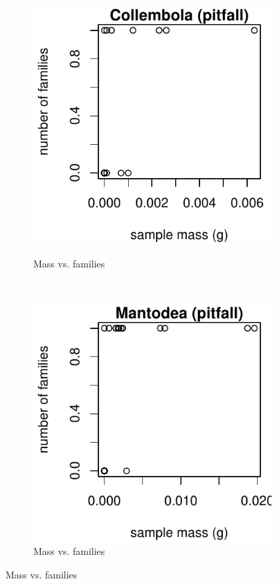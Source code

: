 \documentclass[10pt,letterpaper,twocolumn]{article}
\begin{document}
\begin{figure}[h]
	\centering
	\begin{subfigure}[b]{0.15\textwidth}
		\caption{Mass vs. families}
		\includegraphics[width=\textwidth]{plots/mass-vs-count/scatter/2015_pitfall_Collembola_mass-vs-count.pdf}
		\label{fig:pitfall_collembola_scatter}
	\end{subfigure}
	~
	\begin{subfigure}[b]{0.15\textwidth}
		\caption{Mass vs. families}
		\includegraphics[width=\textwidth]{plots/mass-vs-count/scatter/2015_pitfall_Mantodea_mass-vs-count.pdf}

\end{subfigure}
\end{figure}
\end{document}

